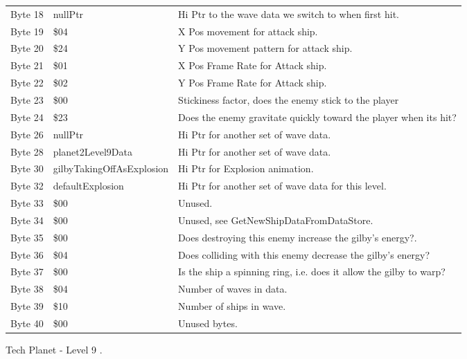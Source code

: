 \begin{figure}[H]
{\begin{adjustbox}{width=12cm}
\begin{tabular}{lll}
 Byte 18 & nullPtr                   & Hi Ptr to the wave data we switch to when first hit.               \\
 Byte 19 & \$04                       & X Pos movement for attack ship.                                    \\
 Byte 20 & \$24                       & Y Pos movement pattern for attack ship.                            \\
 Byte 21 & \$01                       & X Pos Frame Rate for Attack ship.                                  \\
 Byte 22 & \$02                       & Y Pos Frame Rate for Attack ship.                                  \\
 Byte 23 & \$00                       & Stickiness factor, does the enemy stick to the player              \\
 Byte 24 & \$23                       & Does the enemy gravitate quickly toward the player when its hit?   \\
 Byte 26 & nullPtr                   & Hi Ptr for another set of wave data.                               \\
 Byte 28 & planet2Level9Data         & Hi Ptr for another set of wave data.                               \\
 Byte 30 & gilbyTakingOffAsExplosion & Hi Ptr for Explosion animation.                                    \\
 Byte 32 & defaultExplosion          & Hi Ptr for another set of wave data for this level.                \\
 Byte 33 & \$00                       & Unused.                                                            \\
 Byte 34 & \$00                       & Unused, see GetNewShipDataFromDataStore.                           \\
 Byte 35 & \$00                       & Does destroying this enemy increase the gilby's energy?.           \\
 Byte 36 & \$04                       & Does colliding with this enemy decrease the gilby's energy?        \\
 Byte 37 & \$00                       & Is the ship a spinning ring, i.e. does it allow the gilby to warp? \\
 Byte 38 & \$04                       & Number of waves in data.                                           \\
 Byte 39 & \$10                       & Number of ships in wave.                                           \\
 Byte 40 & \$00                       & Unused bytes.                                                      \\
\bottomrule
\end{tabular}

  \end{adjustbox}

  }\caption*{Tech Planet - Level 9
.}
\end{figure}

